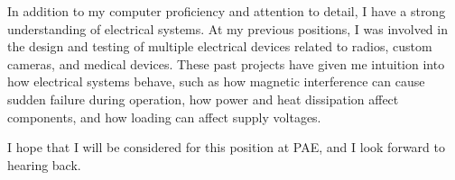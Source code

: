 \documentclass[11pt, a4paper]{awesome-cv}
\begin{document}
\begin{cvletter}
  \tab In addition to my computer proficiency and attention to detail, I have a strong understanding of electrical
  systems.
  At my previous positions, I was involved in the design and testing of multiple electrical devices related to radios,
  custom cameras, and medical devices.
  These past projects have given me intuition into how electrical systems behave,
  such as how magnetic interference can cause sudden failure during operation, how power and heat
  dissipation affect components, and how loading can affect supply voltages.

  \tab I hope that I will be considered for this position at PAE, and I look forward to hearing back.

\end{cvletter}

\makeletterclosing
\end{document}
